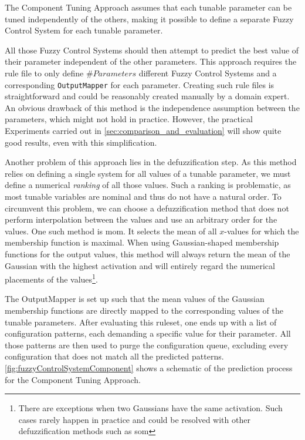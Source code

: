 The Component Tuning Approach assumes that each tunable parameter can be tuned independently of the others, making it possible to define a separate Fuzzy Control System for each tunable parameter.

All those Fuzzy Control Systems should then attempt to predict the best value of their parameter independent of the other parameters. This approach requires the rule file to only define $\#Parameters$ different Fuzzy Control Systems and a corresponding \texttt{OutputMapper} for each parameter. Creating such rule files is straightforward and could be reasonably created manually by a domain expert. An obvious drawback of this method is the independence assumption between the parameters, which might not hold in practice. However, the practical Experiments carried out in \autoref{sec:comparison_and_evaluation} will show quite good results, even with this simplification.

Another problem of this approach lies in the defuzzification step. As this method relies on defining a single system for all values of a tunable parameter, we must define a numerical \emph{ranking} of all those values. Such a ranking is problematic, as most tunable variables are nominal and thus do not have a natural order. To circumvent this problem, we can choose a defuzzification method that does not perform interpolation between the values and use an arbitrary order for the values. One such method is \gls{mom}. It selects the mean of all $x$-values for which the membership function is maximal. When using Gaussian-shaped membership functions for the output values, this method will always return the mean of the Gaussian with the highest activation and will entirely regard the numerical placements of the values\footnote{There are exceptions when two Gaussians have the same activation. Such cases
  rarely happen in practice and could be resolved with other defuzzification methods such as \gls{som}}.

The OutputMapper is set up such that the mean values of the Gaussian membership functions are directly mapped to the corresponding values of the tunable parameters. After evaluating this ruleset, one ends up with a list of configuration patterns, each demanding a specific value for their parameter. All those patterns are then used to purge the configuration queue, excluding every configuration that does not match all the predicted patterns. \autoref{fig:fuzzyControlSystemComponent} shows a schematic of the prediction process for the Component Tuning Approach.



